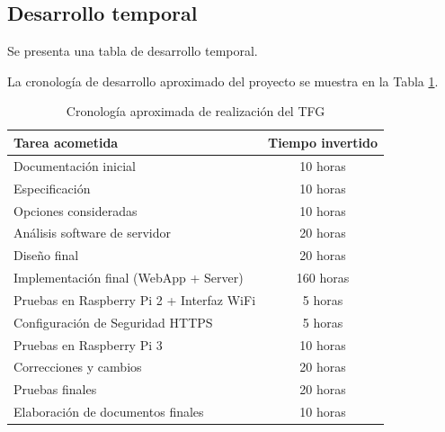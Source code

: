 \begin{appendices}
\cleardoublepage
{}%
\begin{center}
\begin{minipage}{.75\textwidth}
\section{Desarrollo temporal}\label{ApendiceF}

Se presenta una tabla de desarrollo temporal.
\end{minipage}
\end{center}
\clearpage%

La cronología de desarrollo aproximado del proyecto se muestra en la Tabla \ref{tablaTFG}.

\begin{table}[!ht]
\begin{center}
\begin{tabular}{ | l | c | }
\hline
\textbf{Tarea acometida} & \textbf{Tiempo invertido} \\
\hline
Documentación inicial & 10 horas \\ \hline
Especificación & 10 horas \\ \hline
Opciones consideradas & 10 horas \\ \hline
Análisis software de servidor & 20 horas \\ \hline
Diseño final & 20 horas \\ \hline
Implementación final (WebApp + Server) & 160 horas \\ \hline
Pruebas en Raspberry Pi 2 + Interfaz WiFi & 5 horas \\ \hline
Configuración de Seguridad HTTPS & 5 horas \\ \hline
Pruebas en Raspberry Pi 3 & 10 horas \\ \hline
Correcciones y cambios & 20 horas \\ \hline
Pruebas finales & 20 horas \\ \hline
Elaboración de documentos finales & 10 horas \\ \hline
\end{tabular}
\end{center}
\caption{Cronología aproximada de realización del TFG}
\label{tablaTFG}
\end{table}%

\end{appendices}